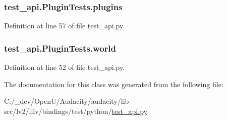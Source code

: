 \subsubsection[{\texorpdfstring{plugins}{plugins}}]{\setlength{\rightskip}{0pt plus 5cm}test\+\_\+api.\+Plugin\+Tests.\+plugins}\hypertarget{classtest__api_1_1_plugin_tests_aee095c9630640536f10bd3559b19f548}{}\label{classtest__api_1_1_plugin_tests_aee095c9630640536f10bd3559b19f548}


Definition at line 57 of file test\+\_\+api.\+py.

\subsubsection[{\texorpdfstring{world}{world}}]{\setlength{\rightskip}{0pt plus 5cm}test\+\_\+api.\+Plugin\+Tests.\+world}\hypertarget{classtest__api_1_1_plugin_tests_a4ce4730d02db0e97cbe86781af75a850}{}\label{classtest__api_1_1_plugin_tests_a4ce4730d02db0e97cbe86781af75a850}


Definition at line 52 of file test\+\_\+api.\+py.



The documentation for this class was generated from the following file\+:\begin{DoxyCompactItemize}
\item 
C\+:/\+\_\+dev/\+Open\+U/\+Audacity/audacity/lib-\/src/lv2/lilv/bindings/test/python/\hyperlink{test__api_8py}{test\+\_\+api.\+py}\end{DoxyCompactItemize}
